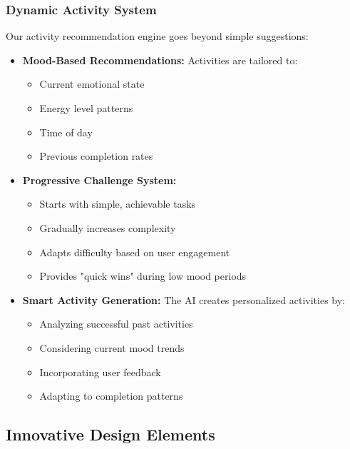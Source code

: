 \documentclass[12pt]{article}
\begin{document}
\subsubsection{Dynamic Activity System}
Our activity recommendation engine goes beyond simple suggestions:
\begin{itemize}
    \item \textbf{Mood-Based Recommendations:} Activities are tailored to:
    \begin{itemize}
        \item Current emotional state
        \item Energy level patterns
        \item Time of day
        \item Previous completion rates
    \end{itemize}
    
    \item \textbf{Progressive Challenge System:} 
    \begin{itemize}
        \item Starts with simple, achievable tasks
        \item Gradually increases complexity
        \item Adapts difficulty based on user engagement
        \item Provides "quick wins" during low mood periods
    \end{itemize}
    
    \item \textbf{Smart Activity Generation:} The AI creates personalized activities by:
    \begin{itemize}
        \item Analyzing successful past activities
        \item Considering current mood trends
        \item Incorporating user feedback
        \item Adapting to completion patterns
    \end{itemize}
\end{itemize}

\subsection{Innovative Design Elements}
\end{document}
